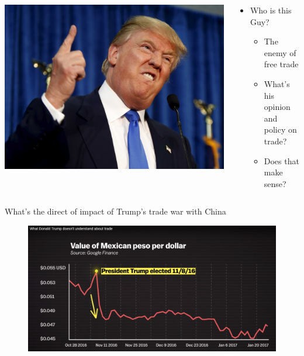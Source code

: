 \documentclass[10pt,hyperref={CJKbookmarks=true},xcolor=dvipsnames,aspectratio=43]{beamer}
\begin{document}
\begin{frame}

\begin{columns}[onlytextwidth]
	\begin{column}{0.45\textwidth}
		\includegraphics[width=\columnwidth]{fig//trump}
	\end{column}
	\begin{column}{0.55\textwidth}
		
		
		\begin{itemize}
			\item Who is this Guy?
			
			\begin{itemize}
				\item The enemy of free trade
				\item What's his opinion and policy on trade?
				\item Does that make sense?
			\end{itemize}
		\end{itemize}
	\end{column}
\end{columns}
\end{frame}

\begin{frame}{What's the direct of impact of Trump's trade war with China}


\begin{figure}
\includegraphics[scale=0.15]{fig//trump2}

\end{figure}

\end{frame}
\end{document}

